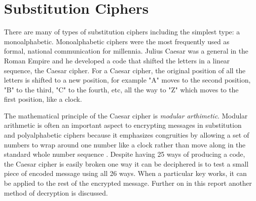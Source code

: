 \documentclass[12pt,letterpaper]{article} %
\begin{document}
\section{Substitution Ciphers}
There are many of types of substitution ciphers including the simplest  type: a monoalphabetic.  Monoalphabetic ciphers were the most frequently used as formal, national communication for millennia.  Julius Caesar was a general in the Roman Empire and he developed a code that shifted the letters in a linear sequence, the Caesar cipher.  For a Caesar cipher, the original position of all the letters is shifted to a new position, for example "A" moves to the second position, "B" to the third, "C" to the fourth, etc, all the way to "Z" which moves to the first position, like a clock. 
\par The mathematical principle of the Caesar cipher is \emph{modular arthimetic}. Modular arithmetic is often an important aspect to encrypting messages in substitution and polyalphabetic ciphers because it emphasizes congruities by allowing a set of numbers to wrap around one number like a clock rather than move along in the standard whole
number sequence \cite{Insall}. Despite having 25 ways of producing a code, the Caesar cipher is easily broken one way it can be deciphered is to test a small piece of encoded message using all 26 ways.  When a particular key works, it can be applied to the rest of the encrypted message. Further on in this report another method of decryption is discussed.
\end{document}

